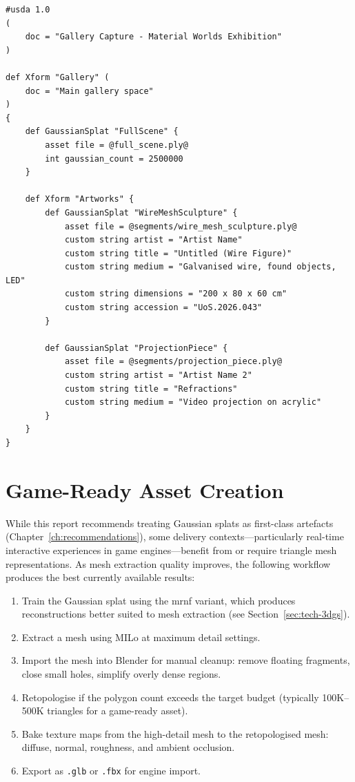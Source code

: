 \begin{lstlisting}[language={}, caption={USD scene graph for a gallery with segmented objects.}, label={lst:usd-scene-graph}]
#usda 1.0
(
    doc = "Gallery Capture - Material Worlds Exhibition"
)

def Xform "Gallery" (
    doc = "Main gallery space"
)
{
    def GaussianSplat "FullScene" {
        asset file = @full_scene.ply@
        int gaussian_count = 2500000
    }

    def Xform "Artworks" {
        def GaussianSplat "WireMeshSculpture" {
            asset file = @segments/wire_mesh_sculpture.ply@
            custom string artist = "Artist Name"
            custom string title = "Untitled (Wire Figure)"
            custom string medium = "Galvanised wire, found objects, LED"
            custom string dimensions = "200 x 80 x 60 cm"
            custom string accession = "UoS.2026.043"
        }

        def GaussianSplat "ProjectionPiece" {
            asset file = @segments/projection_piece.ply@
            custom string artist = "Artist Name 2"
            custom string title = "Refractions"
            custom string medium = "Video projection on acrylic"
        }
    }
}
\end{lstlisting}

\section{Game-Ready Asset Creation}
\label{sec:adv-game-ready}

While this report recommends treating Gaussian splats as first-class artefacts (Chapter~\ref{ch:recommendations}), some delivery contexts---particularly real-time interactive experiences in game engines---benefit from or require triangle mesh representations. As mesh extraction quality improves, the following workflow produces the best currently available results:

\begin{enumerate}
  \item Train the Gaussian splat using the \acrshort{mrnf} variant, which produces reconstructions better suited to mesh extraction (see Section~\ref{sec:tech-3dgs}).
  \item Extract a mesh using MILo at maximum detail settings.
  \item Import the mesh into Blender for manual cleanup: remove floating fragments, close small holes, simplify overly dense regions.
  \item Retopologise if the polygon count exceeds the target budget (typically 100K--500K triangles for a game-ready asset).
  \item Bake texture maps from the high-detail mesh to the retopologised mesh: diffuse, normal, roughness, and ambient occlusion.
  \item Export as \texttt{.glb} or \texttt{.fbx} for engine import.
\end{enumerate}

